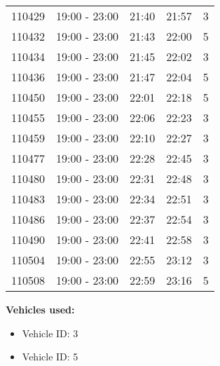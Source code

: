 \documentclass{article}
\begin{document}
\begin{tabular}{llccc}
110429 & 19:00 - 23:00 & 21:40 & 21:57 & 3 \\
110432 & 19:00 - 23:00 & 21:43 & 22:00 & 5 \\
110434 & 19:00 - 23:00 & 21:45 & 22:02 & 3 \\
110436 & 19:00 - 23:00 & 21:47 & 22:04 & 5 \\
110450 & 19:00 - 23:00 & 22:01 & 22:18 & 5 \\
110455 & 19:00 - 23:00 & 22:06 & 22:23 & 3 \\
110459 & 19:00 - 23:00 & 22:10 & 22:27 & 3 \\
110477 & 19:00 - 23:00 & 22:28 & 22:45 & 3 \\
110480 & 19:00 - 23:00 & 22:31 & 22:48 & 3 \\
110483 & 19:00 - 23:00 & 22:34 & 22:51 & 3 \\
110486 & 19:00 - 23:00 & 22:37 & 22:54 & 3 \\
110490 & 19:00 - 23:00 & 22:41 & 22:58 & 3 \\
110504 & 19:00 - 23:00 & 22:55 & 23:12 & 3 \\
110508 & 19:00 - 23:00 & 22:59 & 23:16 & 5 \\
\bottomrule
\end{tabular}

\textbf{Vehicles used:}
\begin{itemize}
  \item Vehicle ID: 3
  \item Vehicle ID: 5
\end{itemize}
\end{document}
